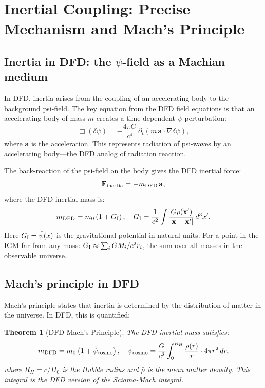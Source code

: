 \documentclass[11pt]{article}
\newtheorem{theorem}{Theorem}
\newcommand{\rhobar}{\bar{\rho}}
\newcommand{\psibar}{\bar{\psi}}
\newcommand{\GI}{G_{\rm I}}
\begin{document}
\section{Inertial Coupling: Precise Mechanism and Mach's Principle}
\label{sec:inertial}

\subsection{Inertia in DFD: the $\psi$-field as a Machian medium}

In DFD, inertia arises from the coupling of an accelerating body to the
background psi-field. The key equation from the DFD field equations is that
an accelerating body of mass $m$ creates a time-dependent $\psi$-perturbation:
\begin{equation}
\Box(\delta\psi) = -\frac{4\pi G}{c^4}\,\partial_t(m\,\mathbf{a}\cdot\nabla\delta\psi),
\label{eq:psi-inertia}
\end{equation}
where $\mathbf{a}$ is the acceleration. This represents radiation of psi-waves
by an accelerating body---the DFD analog of radiation reaction.

The back-reaction of the psi-field on the body gives the DFD inertial force:
\begin{equation}
\mathbf{F}_{\rm inertia} = -m_{\rm DFD}\,\mathbf{a},
\label{eq:F-inertia}
\end{equation}
where the DFD inertial mass is:
\begin{equation}
m_{\rm DFD} = m_0\left(1 + \GI\right),
\quad \GI = \frac{1}{c^2}\int \frac{G\rho(\mathbf{x}')}{|\mathbf{x}-\mathbf{x}'|}\,d^3x'.
\label{eq:mDFD}
\end{equation}
Here $\GI = \psibar(x)$ is the gravitational potential in natural units.
For a point in the IGM far from any mass:
$\GI \approx \sum_i GM_i/c^2 r_i$,
the sum over all masses in the observable universe.

\subsection{Mach's principle in DFD}

Mach's principle states that inertia is determined by the distribution of
matter in the universe. In DFD, this is quantified:

\begin{theorem}[DFD Mach's Principle]
\label{thm:mach}
The DFD inertial mass satisfies:
\begin{equation}
m_{\rm DFD} = m_0\left(1 + \psibar_{\rm cosmo}\right),
\quad \psibar_{\rm cosmo} = \frac{G}{c^2}\int_0^{R_H}\frac{\rhobar(r)}{r}\cdot 4\pi r^2\,dr,
\label{eq:mach-DFD}
\end{equation}
where $R_H = c/H_0$ is the Hubble radius and $\rhobar$ is the mean matter
density. This integral is the DFD version of the Sciama-Mach integral.
\end{theorem}
\end{document}
